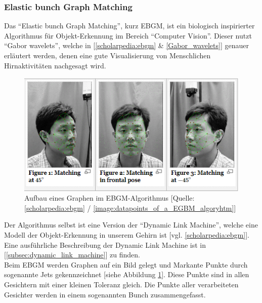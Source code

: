         \subsubsection{Elastic bunch Graph Matching}
        \label{subsubsec:Elastic_bunch_graph_Matching}

            Das \enquote{Elastic bunch Graph Matching}, kurz EBGM, ist ein biologisch inspirierter Algorithmus für Objekt-Erkennung im Bereich \enquote{Computer Vision}. Dieser nutzt \enquote{Gabor wavelets}, welche in [\ref{scholarpedia:ebgm} \& \ref{Gabor_wavelets}] genauer erläutert werden, denen eine gute Visualisierung von Menschlichen Hirnaktivitäten nachgesagt wird.
            \begin{center}
                \begin{figure}[ht]
                    \centering
                    \includegraphics[scale=0.8]{resources/images/img/Face recognition/Elastic Bunch Graph Matching - Figures.png}
                    \caption{Aufbau eines Graphen im EBGM-Algorithmus [Quelle: \ref{scholarpedia:ebgm} / \ref{image:datapoints_of_a_EGBM_algoryhtm}]}
                    \label{fig:Datenpunkte_eines_EGBM-Algorithms}
                \end{figure}
            \end{center}
            Der Algorithmus selbst ist eine Version der \enquote{Dynamic Link Machine}, welche eine Modell der Objekt-Erkennung in unserem Gehirn ist [vgl. \ref{scholarpedia:ebgm}]. Eine ausführliche Beschreibung der Dynamic Link Machine ist in [\ref{subsec:dynamic_link_machine}] zu finden.\\
            Beim EBGM werden Graphen auf ein Bild gelegt und Markante Punkte durch sogenannte Jets gekennzeichnet [siehe Abbildung \ref{fig:Datenpunkte_eines_EGBM-Algorithms}]. Diese Punkte sind in allen Gesichtern mit einer kleinen Toleranz gleich. Die Punkte aller verarbeiteten Gesichter werden in einem sogenannten Bunch zusammengefasst.

